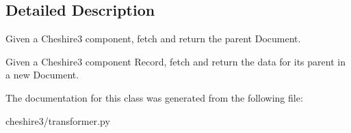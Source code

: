 \subsection{Detailed Description}
\begin{DoxyVerb}Given a Cheshire3 component, fetch and return the parent Document.

Given a Cheshire3 component Record, fetch and return the data for its
parent in a new Document.
\end{DoxyVerb}
 

The documentation for this class was generated from the following file\-:\begin{DoxyCompactItemize}
\item 
cheshire3/transformer.\-py\end{DoxyCompactItemize}
